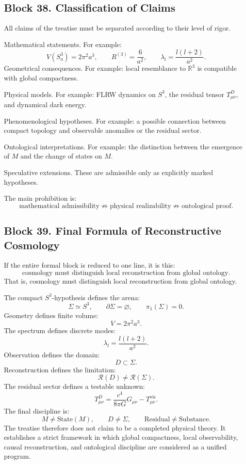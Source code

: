 \documentclass[12pt,a4paper]{article}
\theoremstyle{definition}
\begin{document}
\subsection{Block 38. Classification of Claims}
All claims of the treatise must be separated according to their level of rigor.

Mathematical statements.
For example:
\[
V(S^3_a)=2\pi^2a^3,
\qquad
R^{(3)}=\frac{6}{a^2},
\qquad
\lambda_l=\frac{l(l+2)}{a^2}.
\]
Geometrical consequences.
For example: local resemblance to \(\mathbb R^3\) is compatible with global compactness.

Physical models.
For example: FLRW dynamics on \(S^3\), the residual tensor \(T^D_{\mu\nu}\), and dynamical dark energy.

Phenomenological hypotheses.
For example: a possible connection between compact topology and observable anomalies or the residual sector.

Ontological interpretations.
For example: the distinction between the emergence of \(M\) and the change of states on \(M\).

Speculative extensions.
These are admissible only as explicitly marked hypotheses.

The main prohibition is:
\[
\text{mathematical admissibility}
\not\Rightarrow
\text{physical realizability}
\not\Rightarrow
\text{ontological proof}.
\]
\subsection{Block 39. Final Formula of Reconstructive Cosmology}
If the entire formal block is reduced to one line, it is this:
\[
\text{cosmology must distinguish local reconstruction from global ontology}.
\]
That is, cosmology must distinguish local reconstruction from global ontology.

The compact \(S^3\)-hypothesis defines the arena:
\[
\Sigma\simeq S^3,
\qquad
\partial\Sigma=\varnothing,
\qquad
\pi_1(\Sigma)=0.
\]
Geometry defines finite volume:
\[
V=2\pi^2a^3.
\]
The spectrum defines discrete modes:
\[
\lambda_l=\frac{l(l+2)}{a^2}.
\]
Observation defines the domain:
\[
D\subset\Sigma.
\]
Reconstruction defines the limitation:
\[
\mathcal R(D)\neq \mathcal R(\Sigma).
\]
The residual sector defines a testable unknown:
\[
T^D_{\mu\nu}
=
\frac{c^4}{8\pi G}G_{\mu\nu}
-
T^{\mathrm{vis}}_{\mu\nu}.
\]
The final discipline is:
\[
M\neq \mathrm{State}(M),
\qquad
D\neq \Sigma,
\qquad
\mathrm{Residual}\neq \mathrm{Substance}.
\]
The treatise therefore does not claim to be a completed physical theory. It establishes a strict framework in which global compactness, local observability, causal reconstruction, and ontological discipline are considered as a unified program.
\end{document}
